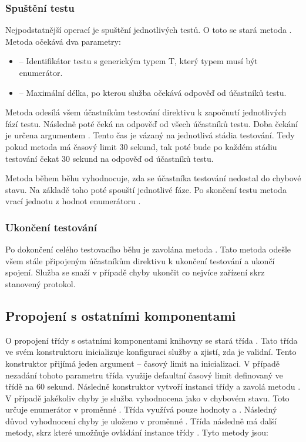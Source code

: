 \subsubsection{Spuštění testu}

Nejpodstatnější operací je spuštění jednotlivých testů. O toto se stará metoda . Metoda očekává dva parametry:

\begin{itemize}
    \item {} -- Identifikátor testu s generickým typem T, který typem musí být enumerátor.
    \item {} -- Maximální délka, po kterou služba očekává odpověď od účastníků testu. 
\end{itemize}

Metoda odesílá všem účastníkům testování direktivu k započnutí jednotlivých fází testu. Následně poté čeká na odpověď od všech účastníků testu. Doba čekání je určena argumentem . Tento čas je vázaný na jednotlivá stádia testování. Tedy pokud metoda má časový limit 30 sekund, tak poté bude po každém stádiu testování čekat 30 sekund na odpověď od účastníků testu.

Metoda během běhu vyhodnocuje, zda se účastníka testování nedostal do chybové stavu. Na základě toho poté spouští jednotlivé fáze. Po skončení testu metoda vrací jednotu z hodnot enumerátoru . 

\subsubsection{Ukončení testování}

Po dokončení celého testovacího běhu je zavolána metoda . Tato metoda odešle všem stále připojeným účastníkům direktivu k ukončení testování a ukončí spojení. Služba se snaží v případě chyby ukončit co nejvíce zařízení skrz stanovený protokol.

\subsection{Propojení s ostatními komponentami}

O propojení třídy  s ostatními komponentami knihovny se stará třída .
Tato třída ve svém konstruktoru inicializuje konfiguraci služby a zjistí, zda je validní. Tento konstruktor přijímá jeden argument -- časový limit na inicializaci. V případě nezadání tohoto parametru třída využije defaultní časový limit definovaný ve třídě na 60 sekund. Následně konstruktor vytvoří instanci třídy  a zavolá metodu . V případě jakékoliv chyby je služba vyhodnocena jako v chybovém stavu. Toto určuje enumerátor  v proměnné . Třída využívá pouze hodnoty  a . Následný důvod vyhodnocení chyby je uloženo v proměnné . Třída následně má další metody, skrz které umožňuje ovládání instance třídy . Tyto metody jsou:

